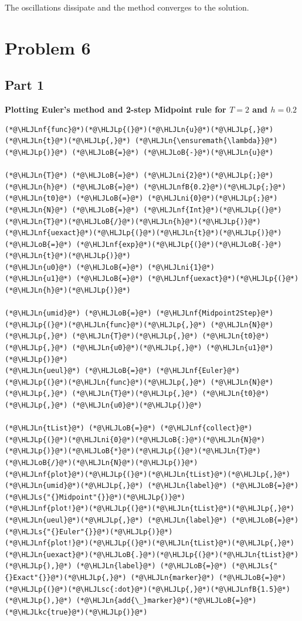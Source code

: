 \documentclass[12pt,a4paper]{article}
\newcommand{\HLJLkc}[1]{\textcolor[RGB]{59,151,46}{\textit{#1}}}
\newcommand{\HLJLn}[1]{#1}
\newcommand{\HLJLnf}[1]{\textcolor[RGB]{66,102,213}{#1}}
\newcommand{\HLJLs}[1]{\textcolor[RGB]{201,61,57}{#1}}
\newcommand{\HLJLsc}[1]{\textcolor[RGB]{201,61,57}{#1}}
\newcommand{\HLJLnfB}[1]{\textcolor[RGB]{59,151,46}{#1}}
\newcommand{\HLJLni}[1]{\textcolor[RGB]{59,151,46}{#1}}
\newcommand{\HLJLoB}[1]{\textcolor[RGB]{102,102,102}{\textbf{#1}}}
\newcommand{\HLJLp}[1]{#1}
\begin{document}
The oscillations dissipate and the method converges to the solution.

\section{Problem 6}
\subsection{Part 1}
\textbf{Plotting Euler's method and 2-step Midpoint rule for $T = 2$ and $h=0.2$}


\begin{lstlisting}
(*@\HLJLnf{func}@*)(*@\HLJLp{(}@*)(*@\HLJLn{u}@*)(*@\HLJLp{,}@*)(*@\HLJLn{t}@*)(*@\HLJLp{,}@*) (*@\HLJLn{\ensuremath{\lambda}}@*)(*@\HLJLp{)}@*) (*@\HLJLoB{=}@*) (*@\HLJLoB{-}@*)(*@\HLJLn{u}@*)

(*@\HLJLn{T}@*) (*@\HLJLoB{=}@*) (*@\HLJLni{2}@*)(*@\HLJLp{;}@*) (*@\HLJLn{h}@*) (*@\HLJLoB{=}@*) (*@\HLJLnfB{0.2}@*)(*@\HLJLp{;}@*) (*@\HLJLn{t0}@*) (*@\HLJLoB{=}@*) (*@\HLJLni{0}@*)(*@\HLJLp{;}@*)
(*@\HLJLn{N}@*) (*@\HLJLoB{=}@*) (*@\HLJLnf{Int}@*)(*@\HLJLp{(}@*)(*@\HLJLn{T}@*)(*@\HLJLoB{/}@*)(*@\HLJLn{h}@*)(*@\HLJLp{)}@*)
(*@\HLJLnf{uexact}@*)(*@\HLJLp{(}@*)(*@\HLJLn{t}@*)(*@\HLJLp{)}@*) (*@\HLJLoB{=}@*) (*@\HLJLnf{exp}@*)(*@\HLJLp{(}@*)(*@\HLJLoB{-}@*)(*@\HLJLn{t}@*)(*@\HLJLp{)}@*)
(*@\HLJLn{u0}@*) (*@\HLJLoB{=}@*) (*@\HLJLni{1}@*)
(*@\HLJLn{u1}@*) (*@\HLJLoB{=}@*) (*@\HLJLnf{uexact}@*)(*@\HLJLp{(}@*)(*@\HLJLn{h}@*)(*@\HLJLp{)}@*)

(*@\HLJLn{umid}@*) (*@\HLJLoB{=}@*) (*@\HLJLnf{Midpoint2Step}@*)(*@\HLJLp{(}@*)(*@\HLJLn{func}@*)(*@\HLJLp{,}@*) (*@\HLJLn{N}@*)(*@\HLJLp{,}@*) (*@\HLJLn{T}@*)(*@\HLJLp{,}@*) (*@\HLJLn{t0}@*)(*@\HLJLp{,}@*) (*@\HLJLn{u0}@*)(*@\HLJLp{,}@*) (*@\HLJLn{u1}@*)(*@\HLJLp{)}@*)
(*@\HLJLn{ueul}@*) (*@\HLJLoB{=}@*) (*@\HLJLnf{Euler}@*)(*@\HLJLp{(}@*)(*@\HLJLn{func}@*)(*@\HLJLp{,}@*) (*@\HLJLn{N}@*)(*@\HLJLp{,}@*) (*@\HLJLn{T}@*)(*@\HLJLp{,}@*) (*@\HLJLn{t0}@*)(*@\HLJLp{,}@*) (*@\HLJLn{u0}@*)(*@\HLJLp{)}@*)

(*@\HLJLn{tList}@*) (*@\HLJLoB{=}@*) (*@\HLJLnf{collect}@*)(*@\HLJLp{(}@*)(*@\HLJLni{0}@*)(*@\HLJLoB{:}@*)(*@\HLJLn{N}@*)(*@\HLJLp{)}@*)(*@\HLJLoB{*}@*)(*@\HLJLp{(}@*)(*@\HLJLn{T}@*)(*@\HLJLoB{/}@*)(*@\HLJLn{N}@*)(*@\HLJLp{)}@*)
(*@\HLJLnf{plot}@*)(*@\HLJLp{(}@*)(*@\HLJLn{tList}@*)(*@\HLJLp{,}@*)(*@\HLJLn{umid}@*)(*@\HLJLp{,}@*) (*@\HLJLn{label}@*) (*@\HLJLoB{=}@*) (*@\HLJLs{"{}Midpoint"{}}@*)(*@\HLJLp{)}@*)
(*@\HLJLnf{plot!}@*)(*@\HLJLp{(}@*)(*@\HLJLn{tList}@*)(*@\HLJLp{,}@*)(*@\HLJLn{ueul}@*)(*@\HLJLp{,}@*) (*@\HLJLn{label}@*) (*@\HLJLoB{=}@*) (*@\HLJLs{"{}Euler"{}}@*)(*@\HLJLp{)}@*)
(*@\HLJLnf{plot!}@*)(*@\HLJLp{(}@*)(*@\HLJLn{tList}@*)(*@\HLJLp{,}@*)(*@\HLJLn{uexact}@*)(*@\HLJLoB{.}@*)(*@\HLJLp{(}@*)(*@\HLJLn{tList}@*)(*@\HLJLp{),}@*) (*@\HLJLn{label}@*) (*@\HLJLoB{=}@*) (*@\HLJLs{"{}Exact"{}}@*)(*@\HLJLp{,}@*) (*@\HLJLn{marker}@*) (*@\HLJLoB{=}@*) (*@\HLJLp{(}@*)(*@\HLJLsc{:dot}@*)(*@\HLJLp{,}@*)(*@\HLJLnfB{1.5}@*)(*@\HLJLp{),}@*) (*@\HLJLn{add{\_}marker}@*)(*@\HLJLoB{=}@*)(*@\HLJLkc{true}@*)(*@\HLJLp{)}@*)
\end{lstlisting}
\end{document}
